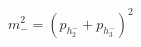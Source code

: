 \documentclass[border={1pt 1pt 1pt 1pt}]{standalone}
\begin{document}
$m_-^2 = (p_{h_2^-} + p_{h_3^-})^2$
\end{document}
